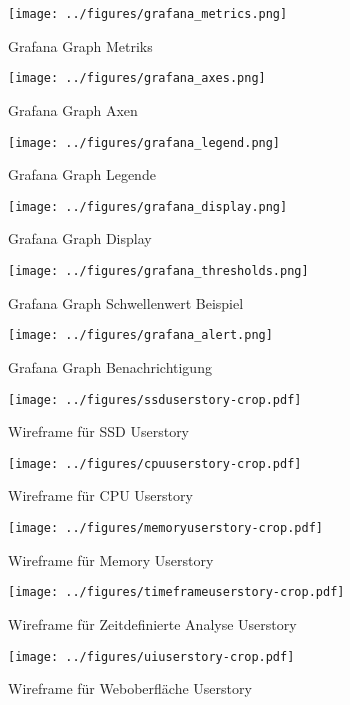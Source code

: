 \begin{figure}[tbp]
  \centering
  \texttt{[image: ../figures/grafana\_metrics.png]}
  \caption{Grafana Graph Metriks}
\label{figure:grafana_metrics}
\end{figure}

\begin{figure}[tbp]
  \centering
  \texttt{[image: ../figures/grafana\_axes.png]}
  \caption{Grafana Graph Axen}
\label{figure:grafana_axes}
\end{figure}

\begin{figure}[tbp]
  \centering
  \texttt{[image: ../figures/grafana\_legend.png]}
  \caption{Grafana Graph Legende}
\label{figure:grafana_legend}
\end{figure}

\begin{figure}[tbp]
  \centering
  \texttt{[image: ../figures/grafana\_display.png]}
  \caption{Grafana Graph Display}
\label{figure:grafana_display}
\end{figure}

\begin{figure}[tbp]
  \centering
  \texttt{[image: ../figures/grafana\_thresholds.png]}
  \caption{Grafana Graph Schwellenwert Beispiel}
\label{figure:grafana_thresholds}
\end{figure}

\begin{figure}[tbp]
  \centering
  \texttt{[image: ../figures/grafana\_alert.png]}
  \caption{Grafana Graph Benachrichtigung}
\label{figure:grafana_alert}
\end{figure}

\begin{figure}[tbp]
  \centering
  \texttt{[image: ../figures/ssduserstory-crop.pdf]}
  \caption{Wireframe für SSD Userstory}
\label{figure:ssduserstory}
\end{figure}

\begin{figure}[tbp]
  \centering
  \texttt{[image: ../figures/cpuuserstory-crop.pdf]}
  \caption{Wireframe für CPU Userstory}
\label{figure:cpuuserstory}
\end{figure}

\begin{figure}[tbp]
  \centering
  \texttt{[image: ../figures/memoryuserstory-crop.pdf]}
  \caption{Wireframe für Memory Userstory}
\label{figure:memoryuserstory}
\end{figure}

\begin{figure}[tbp]
  \centering
  \texttt{[image: ../figures/timeframeuserstory-crop.pdf]}
  \caption{Wireframe für Zeitdefinierte Analyse Userstory}
\label{figure:timeframeuserstory}
\end{figure}

\begin{figure}[tbp]
  \centering
  \texttt{[image: ../figures/uiuserstory-crop.pdf]}
  \caption{Wireframe für Weboberfläche Userstory}
\label{figure:uiuserstory}
\end{figure}
